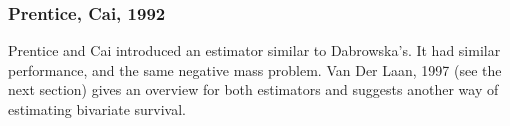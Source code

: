 \documentclass[]{article}
\begin{document}

\subsubsection{Prentice, Cai, 1992 \cite{prentice1992covariance}}
Prentice and Cai introduced an estimator similar to Dabrowska's. It had similar performance, and the same negative mass problem. Van Der Laan, 1997 \cite{van1997nonparametric} (see the next section) gives an overview for both estimators and suggests another way of estimating bivariate survival.
\end{document}
